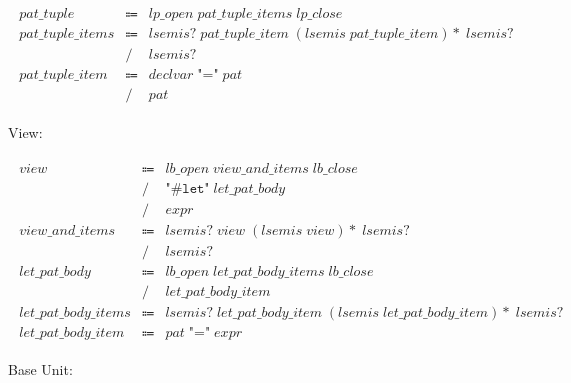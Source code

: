 \begin{align*}
    \begin{array}{rcll}
        \mathit{pat\_tuple}
        &\Coloneq &\mathit{lp\_open}\; \mathit{pat\_tuple\_items}\; \mathit{lp\_close} \\
        \mathit{pat\_tuple\_items}
        &\Coloneq &\mathit{lsemis}{?}\; \mathit{pat\_tuple\_item}\; (\mathit{lsemis}\; \mathit{pat\_tuple\_item}){*}\; \mathit{lsemis}{?} \\
        &\mathrel{/} &\mathit{lsemis}{?} \\
        \mathit{pat\_tuple\_item}
        &\Coloneq &\mathit{declvar}\; \texttt{"="}\; \mathit{pat} \\
        &\mathrel{/} &\mathit{pat}
    \end{array}
\end{align*}

View:

\begin{align*}
    \begin{array}{rcll}
        \mathit{view}
        &\Coloneq &\mathit{lb\_open}\; \mathit{view\_and\_items}\; \mathit{lb\_close} \\
        &\mathrel{/} &\texttt{"\#let"}\; \mathit{let\_pat\_body} \\
        &\mathrel{/} &\mathit{expr} \\
        \mathit{view\_and\_items}
        &\Coloneq &\mathit{lsemis}{?}\; \mathit{view}\; (\mathit{lsemis}\; \mathit{view}){*}\; \mathit{lsemis}{?} \\
        &\mathrel{/} &\mathit{lsemis}{?} \\
        \mathit{let\_pat\_body}
        &\Coloneq &\mathit{lb\_open}\; \mathit{let\_pat\_body\_items}\; \mathit{lb\_close} \\
        &\mathrel{/} &\mathit{let\_pat\_body\_item} \\
        \mathit{let\_pat\_body\_items}
        &\Coloneq &\mathit{lsemis}{?}\; \mathit{let\_pat\_body\_item}\; (\mathit{lsemis}\; \mathit{let\_pat\_body\_item}){*}\; \mathit{lsemis}{?} \\
        \mathit{let\_pat\_body\_item}
        &\Coloneq &\mathit{pat}\; \texttt{"="}\; \mathit{expr}
    \end{array}
\end{align*}

Base Unit:

